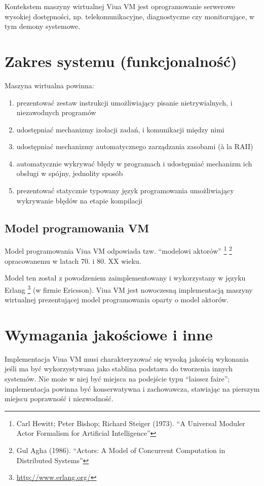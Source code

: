 \documentclass[11pt,oneside,a4paper,titlepage,onecolumn]{article}
\begin{document}
Kontekstem maszyny wirtualnej Viua VM jest oprogramowanie serwerowe wysokiej dostępności, np.
telekomunikacyjne, diagnostyczne czy monitorujące, w tym demony systemowe.

\section{Zakres systemu (funkcjonalność)}

Maszyna wirtualna powinna:

\begin{enumerate}
    \item prezentować zestaw instrukcji umożliwiający pisanie nietrywialnych, i niezawodnych programów
    \item udostępniać mechanizmy izolacji zadań, i komunikacji między nimi
    \item udostępniać mechanizmy automatycznego zarządzania zasobami (à la RAII)
    \item automatycznie wykrywać błędy w programach i udostępniać mechanizm ich obsługi w spójny, jednolity
        sposób
    \item prezentować statycznie typowany język programowania umożliwiający wykrywanie błędów na etapie
        kompilacji
\end{enumerate}

\subsection{Model programowania VM}

Model programowania Viua VM odpowiada tzw. ``modelowi aktorów''
\footnote{Carl Hewitt; Peter Bishop; Richard Steiger (1973). ``A Universal Moduler Actor Formalism for
Artificial Intelligence''}
\footnote{Gul Agha (1986). ``Actors: A Model of Concurrent Computation in Distributed Systems''}
opracowanemu w latach 70. i 80. XX wieku.

Model ten został z powodzeniem zaimplementowany i wykorzystany w języku Erlang
\footnote{\url{http://www.erlang.org/}} (w firmie Ericsson).
Viua VM jest nowoczesną implementacją maszyny wirtualnej prezentującej model programowania oparty o model
aktorów.

\section{Wymagania jakościowe i inne}

Implementacja Viua VM musi charakteryzować się wysoką jakością wykonania jeśli ma być wykorzystywana jako
stablina podstawa do tworzenia innych systemów. Nie może w niej być miejsca na podejście typu ``laissez
faire''; implementacja powinna być konserwatywna i zachowawcza, stawiając na pierszym miejscu poprawność i
niezwodność.
\end{document}
